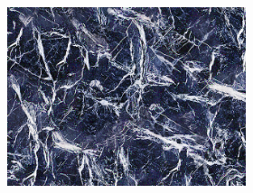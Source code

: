 \begin{figure}[]
\begin{subfigure}{\textwidth}
\begin{subfigure}{0.19\textwidth}
        \end{subfigure}
        \hfill
        \begin{subfigure}{0.19\textwidth}
            \centering
            \includegraphics[width=\textwidth]{images/04-experiment02/isolating_issues/255_pixel.jpg}
            \caption*{}
        \end{subfigure}
        

\end{subfigure}
\end{figure}
